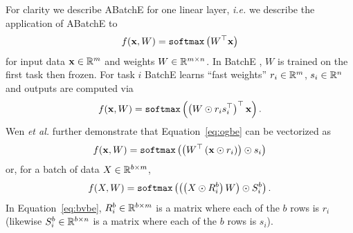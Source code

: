 \documentclass{article}
\begin{document}
For clarity we describe ABatchE for one linear layer, \textit{i.e.} we describe the application of ABatchE to
\begin{align}
    f(\mathbf{x}, W) = \texttt{softmax}\left( W^\top \mathbf{x} \right)
\end{align}
for input data $\mathbf{x} \in \mathbb{R}^m$ and weights  $W \in \mathbb{R}^{m \times n}$. In BatchE \cite{wen2020batchensemble}, $W$ is trained on the first task then frozen. For task $i$ BatchE learns ``fast weights'' $r_i \in \mathbb{R}^{m}$, $s_i \in \mathbb{R}^{n}$ and outputs are computed via
\begin{align} \label{eq:ogbe}
    f(\mathbf{x}, W) = \texttt{softmax}\left( \left( W \odot r_i s_i^\top   \right)^\top \mathbf{x} \right).
\end{align}
Wen \textit{et al.} \cite{wen2020batchensemble} further demonstrate that Equation~\ref{eq:ogbe} can be vectorized as
\begin{align} \label{eq:vbe}
    f(\mathbf{x}, W) = \texttt{softmax}\left(  \left( W^\top \left( \mathbf{x} \odot r_i  \right) \right) \odot s_i  \right)
\end{align}
or, for a batch of data $X \in \mathbb{R}^{b \times m}$,
\begin{align} \label{eq:bvbe}
    f(X, W) = \texttt{softmax}\left(  \left( \left( X \odot R^{b}_i  \right)  W \right) \odot S^{b}_i  \right).
\end{align}
In Equation~\ref{eq:bvbe}, $R^b_i \in \mathbb{R}^{b \times m}$ is a matrix where each of the $b$ rows is $r_i$ (likewise $S^b_i \in \mathbb{R}^{b \times n}$ is a matrix where each of the $b$ rows is $s_i$).
\end{document}
